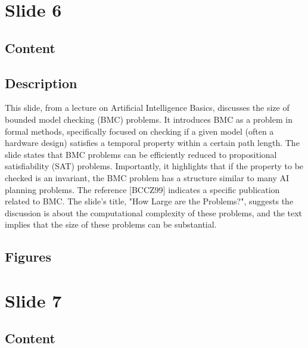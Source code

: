 \documentclass{article}%
\begin{document}
\section{Slide 6}%
\label{sec:Slide6}%
\subsection{Content}%
%
\subsection{Description}%
This slide, from a lecture on Artificial Intelligence Basics, discusses the size of bounded model checking (BMC) problems.  It introduces BMC as a problem in formal methods, specifically focused on checking if a given model (often a hardware design) satisfies a temporal property within a certain path length.  The slide states that BMC problems can be efficiently reduced to propositional satisfiability (SAT) problems.  Importantly, it highlights that if the property to be checked is an invariant, the BMC problem has a structure similar to many AI planning problems.  The reference [BCCZ99] indicates a specific publication related to BMC.  The slide's title, "How Large are the Problems?", suggests the discussion is about the computational complexity of these problems, and the text implies that the size of these problems can be substantial.%
\subsection{Figures}%
\begin{figure}[H]%
\centering%
\end{figure}

%
\newpage%
\section{Slide 7}%
\label{sec:Slide7}%
\subsection{Content}%
%
\end{document}
